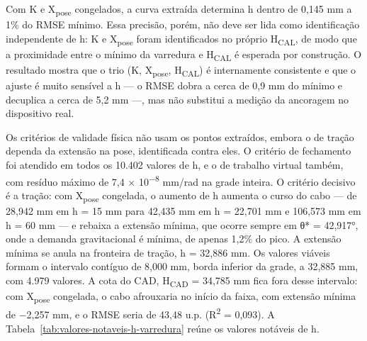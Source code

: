 Com K e X\textsubscript{pose} congelados, a curva extraída determina h dentro de 0,145 mm a 1\% do RMSE mínimo. Essa precisão, porém, não deve ser lida como identificação independente de h: K e X\textsubscript{pose} foram identificados no próprio H\textsubscript{CAL}, de modo que a proximidade entre o mínimo da varredura e H\textsubscript{CAL} é esperada por construção. O resultado mostra que o trio (K, X\textsubscript{pose}, H\textsubscript{CAL}) é internamente consistente e que o ajuste é muito sensível a h — o RMSE dobra a cerca de 0,9 mm do mínimo e decuplica a cerca de 5,2 mm —, mas não substitui a medição da ancoragem no dispositivo real.

Os critérios de validade física não usam os pontos extraídos, embora o de tração dependa da extensão na pose, identificada contra eles. O critério de fechamento foi atendido em todos os 10.402 valores de h, e o de trabalho virtual também, com resíduo máximo de 7,4 × 10\textsuperscript{−8} mm/rad na grade inteira. O critério decisivo é a tração: com X\textsubscript{pose} congelada, o aumento de h aumenta o curso do cabo — de 28,942 mm em h = 15 mm para 42,435 mm em h = 22,701 mm e 106,573 mm em h = 60 mm — e rebaixa a extensão mínima, que ocorre sempre em θ* = 42,917°, onde a demanda gravitacional é mínima, de apenas 1,2\% do pico. A extensão mínima se anula na fronteira de tração, h = 32,886 mm. Os valores viáveis formam o intervalo contíguo de 8,000 mm, borda inferior da grade, a 32,885 mm, com 4.979 valores. A cota do CAD, H\textsubscript{CAD} = 34,785 mm fica fora desse intervalo: com X\textsubscript{pose} congelada, o cabo afrouxaria no início da faixa, com extensão mínima de −2,257 mm, e o RMSE seria de 43,48 u.p. (R\textsuperscript{2} = 0,093). A Tabela~\ref{tab:valores-notaveis-h-varredura} reúne os valores notáveis de h.

